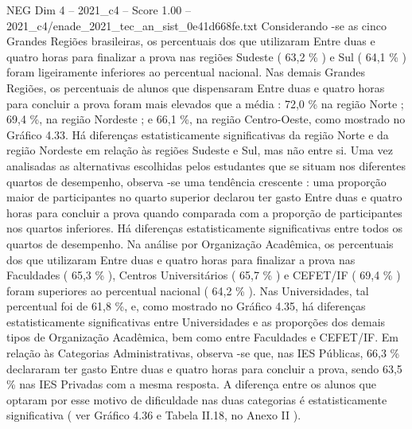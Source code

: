 \begin{textsample}{NEG Dim 4 – 2021\_c4 – Score 1.00 – 2021\_c4/enade\_2021\_tec\_an\_sist\_0e41d668fe.txt}
Considerando -se as cinco Grandes Regiões brasileiras, os percentuais dos que utilizaram Entre duas e quatro horas para finalizar a prova nas regiões Sudeste ( 63,2 \% ) e Sul ( 64,1 \% ) foram ligeiramente inferiores ao percentual nacional.
Nas demais Grandes Regiões, os percentuais de alunos que dispensaram Entre duas e quatro horas para concluir a prova foram mais elevados que a média : 72,0 \% na região Norte ; 69,4 \%, na região Nordeste ; e 66,1 \%, na região Centro-Oeste, como mostrado no Gráfico 4.33.
Há diferenças estatisticamente significativas da região Norte e da região Nordeste em relação às regiões Sudeste e Sul, mas não entre si.
Uma vez analisadas as alternativas escolhidas pelos estudantes que se situam nos diferentes quartos de desempenho, observa -se uma tendência crescente : uma proporção maior de participantes no quarto superior declarou ter gasto Entre duas e quatro horas para concluir a prova quando comparada com a proporção de participantes nos quartos inferiores.
Há diferenças estatisticamente significativas entre todos os quartos de desempenho.
Na análise por Organização Acadêmica, os percentuais dos que utilizaram Entre duas e quatro horas para finalizar a prova nas Faculdades ( 65,3 \% ), Centros Universitários ( 65,7 \% ) e CEFET/IF ( 69,4 \% ) foram superiores ao percentual nacional ( 64,2 \% ).
Nas Universidades, tal percentual foi de 61,8 \%, e, como mostrado no Gráfico 4.35, há diferenças estatisticamente significativas entre Universidades e as proporções dos demais tipos de Organização Acadêmica, bem como entre Faculdades e CEFET/IF.
Em relação às Categorias Administrativas, observa -se que, nas IES Públicas, 66,3 \% declararam ter gasto Entre duas e quatro horas para concluir a prova, sendo 63,5 \% nas IES Privadas com a mesma resposta.
A diferença entre os alunos que optaram por esse motivo de dificuldade nas duas categorias é estatisticamente significativa ( ver Gráfico 4.36 e Tabela II.18, no Anexo II ).

\end{textsample}
